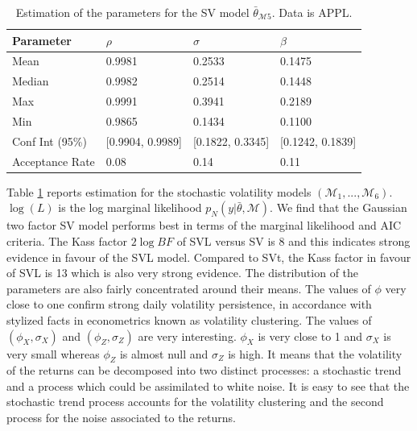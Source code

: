 \documentclass[11pt,a4,twosided,singlespacing,titlepagenumber=on]{scrreprt}
\numberwithin{equation}{chapter} %
\theoremstyle{remark}
\begin{document}
\begin{table}[htb]
\centering
\begin{tabular}{llll}
\label{marginal_log_lik_appl}
Parameter    		& $\rho$ & $\sigma$ & $\beta$ \\ 
\hline
Mean            & 0.9981              & 0.2533             & 0.1475\\
Median          & 0.9982              & 0.2514             & 0.1448\\
Max             & 0.9991              & 0.3941             & 0.2189\\
Min             & 0.9865              & 0.1434             & 0.1100\\
Conf Int (95\%) & [0.9904, 0.9989]    & [0.1822, 0.3345]   & [0.1242, 0.1839]\\
Acceptance Rate & 0.08                & 0.14               & 0.11 \\
\hline
\end{tabular}
\caption{Estimation of the parameters for the SV model $\bar{\theta}_{\mathcal{M}5}$. Data is APPL.}
\end{table}

Table \ref{marginal_log_lik_appl} reports estimation for the stochastic volatility models $(\mathcal{M}_1, ..., \mathcal{M}_6)$. $\log (L)$ is the log marginal likelihood $p_N(y|\bar{\theta}, \mathcal{M})$. We find that the Gaussian two factor SV model performs best in terms of the marginal likelihood and AIC criteria. The Kass factor $2 \log BF$ of SVL versus SV is 8 and this indicates strong evidence in favour of the SVL model. Compared to SVt, the Kass factor in favour of SVL is 13 which is also very strong evidence. The distribution of the parameters are also fairly concentrated around their means. The values of $\phi$ very close to one confirm strong daily volatility persistence, in accordance with stylized facts in econometrics known as volatility clustering. The values of $(\phi_X, \sigma_X)$ and $(\phi_Z, \sigma_Z)$ are very interesting. $\phi_X$ is very close to 1 and $\sigma_X$ is very small whereas $\phi_Z$ is almost null and $\sigma_Z$ is high. It means that the volatility of the returns can be decomposed into two distinct processes: a stochastic trend and a process which could be assimilated to white noise. It is easy to see that the stochastic trend process accounts for the volatility clustering and the second process for the noise associated to the returns.
\end{document}
